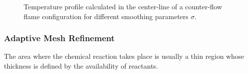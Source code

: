 \begin{figure}
	\centering
	\caption{Temperature profile calculated in the center-line of a counter-flow flame configuration for different smoothing parameters $\sigma$.}
	\label{fig:smoothings}
\end{figure}

\subsubsection{Adaptive Mesh Refinement}\label{ssec:MeshRefinement}
The area where the chemical reaction takes place is usually a thin region whose thickness is defined by the availability of reactants.
